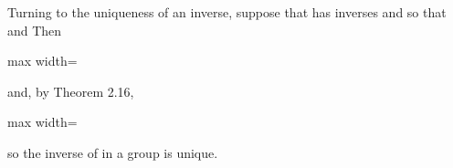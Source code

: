 \documentclass[11pt,oneside]{article}
\begin{document}
\begin{BookBody}
Turning to the uniqueness of an inverse, suppose that  has inverses  and  so that  and  Then

\begin{center}\begin{adjustbox}{max width=\linewidth}\end{adjustbox}\end{center}

\noindent and, by Theorem 2.16,

\begin{center}\begin{adjustbox}{max width=\linewidth}\end{adjustbox}\end{center}

\noindent so the inverse of  in a group is unique. \BookEnd{\blacklozenge}

\end{BookBody}

\BookNarrativetrue
\end{document}
